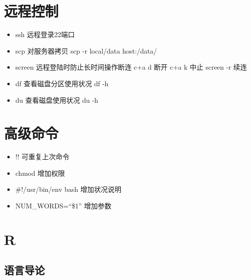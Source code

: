\documentclass[]{book}
\providecommand{\tightlist}{%
  \setlength{\itemsep}{0pt}\setlength{\parskip}{0pt}}
\begin{document}
\hypertarget{ux8fdcux7a0bux63a7ux5236}{%
\section{远程控制}\label{ux8fdcux7a0bux63a7ux5236}}

\begin{itemize}
\tightlist
\item
  ssh 远程登录22端口
\item
  scp 对服务器拷贝 scp -r local/data host:/data/
\item
  screen 远程登陆时防止长时间操作断连 c+a d 断开 c+a k 中止 screen -r 续连
\item
  df 查看磁盘分区使用状况 df -h
\item
  du 查看磁盘使用状况 du -h
\end{itemize}

\hypertarget{ux9ad8ux7ea7ux547dux4ee4}{%
\section{高级命令}\label{ux9ad8ux7ea7ux547dux4ee4}}

\begin{itemize}
\item
  !! 可重复上次命令
\item
  chmod 增加权限
\item
  \#!/usr/bin/env bash 增加状况说明
\item
  NUM\_WORDS=``\$1'' 增加参数
\end{itemize}

\hypertarget{r}{%
\section{R}\label{r}}

\hypertarget{ux8bedux8a00ux5bfcux8bba}{%
\subsection{语言导论}\label{ux8bedux8a00ux5bfcux8bba}}
\end{document}
